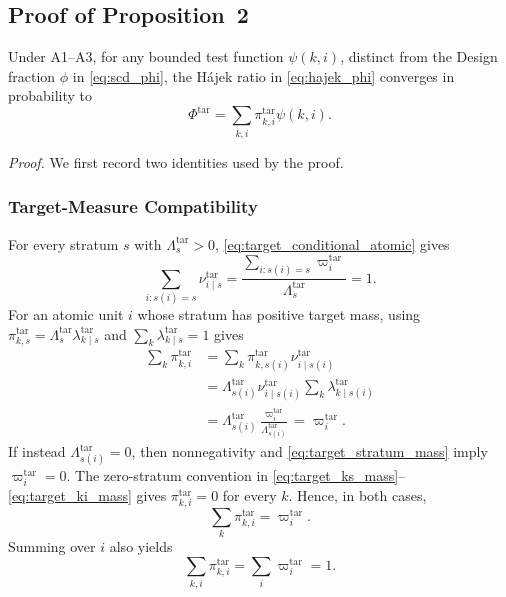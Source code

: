 \subsection{Proof of Proposition~2}
\label{app:proof_prop2}

\begin{proposition*}
Under A1--A3, for any bounded test function $\psi(k,i)$, distinct from
the Design fraction $\phi$ in \eqref{eq:scd_phi}, the H\'ajek ratio in
\eqref{eq:hajek_phi} converges in probability to
\begin{equation}
    \Phi^{\mathrm{tar}}
    =
    \sum_{k,i}
    \pi^{\mathrm{tar}}_{k,i}\psi(k,i).
    \label{eq:app_target_phi}
\end{equation}
\end{proposition*}

\noindent\emph{Proof.}
We first record two identities used by the proof.

\subsubsection{Target-Measure Compatibility}

For every stratum $s$ with $\Lambda_s^{\mathrm{tar}}>0$,
\eqref{eq:target_conditional_atomic} gives
\begin{equation}
    \sum_{i:s(i)=s}
    \nu^{\mathrm{tar}}_{i\mid s}
    =
    \frac{
    \sum_{i:s(i)=s}\varpi_i^{\mathrm{tar}}
    }{
    \Lambda_s^{\mathrm{tar}}
    }
    =1.
    \label{eq:app_nu_normalization}
\end{equation}
For an atomic unit $i$ whose stratum has positive target mass, using
$\pi^{\mathrm{tar}}_{k,s}
=\Lambda_s^{\mathrm{tar}}
\lambda^{\mathrm{tar}}_{k\mid s}$ and
$\sum_k\lambda^{\mathrm{tar}}_{k\mid s}=1$ gives
\begin{align}
 \sum_k\pi^{\mathrm{tar}}_{k,i}
 &=
 \sum_k
 \pi^{\mathrm{tar}}_{k,s(i)}
 \nu^{\mathrm{tar}}_{i\mid s(i)}
 \nonumber\\
 &=
 \Lambda_{s(i)}^{\mathrm{tar}}
 \nu^{\mathrm{tar}}_{i\mid s(i)}
 \sum_k
 \lambda^{\mathrm{tar}}_{k\mid s(i)}
 \nonumber\\
 &=
 \Lambda_{s(i)}^{\mathrm{tar}}
 \frac{\varpi_i^{\mathrm{tar}}}
 {\Lambda_{s(i)}^{\mathrm{tar}}}
 =
 \varpi_i^{\mathrm{tar}}.
 \label{eq:app_target_compatibility_positive}
\end{align}
If instead $\Lambda_{s(i)}^{\mathrm{tar}}=0$, then nonnegativity and
\eqref{eq:target_stratum_mass} imply $\varpi_i^{\mathrm{tar}}=0$.  The
zero-stratum convention in
\eqref{eq:target_ks_mass}--\eqref{eq:target_ki_mass}
gives $\pi^{\mathrm{tar}}_{k,i}=0$ for every $k$.  Hence, in both cases,
\begin{equation}
 \sum_k\pi^{\mathrm{tar}}_{k,i}
 =\varpi_i^{\mathrm{tar}}.
 \label{eq:app_target_compatibility}
\end{equation}
Summing over $i$ also yields
\begin{equation}
    \sum_{k,i}\pi^{\mathrm{tar}}_{k,i}
    =
    \sum_i\varpi_i^{\mathrm{tar}}
    =1.
    \label{eq:app_pi_normalized}
\end{equation}

